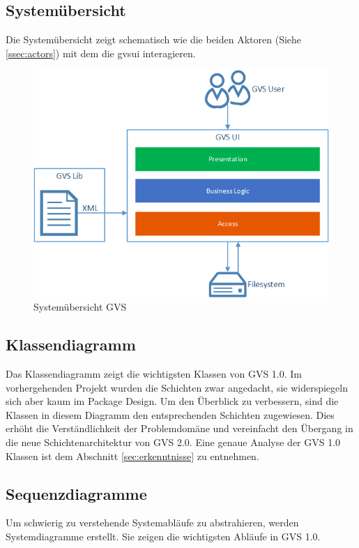 \documentclass[11pt,a4paper,english,oneside]{book}
\numberwithin{equation}{chapter}
\begin{document}
	\subsection{Systemübersicht}
	Die Systemübersicht zeigt schematisch wie die beiden Aktoren (Siehe \ref{ssec:actors}) mit dem  die \gls{gvsui} interagieren.
	
	\begin{figure}[h!]
		\centering
		\includegraphics[width=0.5\linewidth]{assets/images/system_overview}
		\caption{Systemübersicht GVS}
		\label{fig:gvs-systemuebersicht}
	\end{figure}
	
	\subsection{Klassendiagramm} \label{ssec:klassendiagramm-1}
	Das Klassendiagramm zeigt die wichtigsten Klassen von GVS 1.0. Im vorhergehenden Projekt wurden die Schichten zwar angedacht, sie widerspiegeln sich aber kaum im Package Design. Um den Überblick zu verbessern, sind die Klassen in diesem Diagramm den entsprechenden Schichten zugewiesen. Dies erhöht die Verständlichkeit der Problemdomäne und vereinfacht den Übergang in die neue Schichtenarchitektur von GVS 2.0. Eine genaue Analyse der GVS 1.0 Klassen ist dem Abschnitt \ref{sec:erkenntnisse} zu entnehmen. 
	
	
		
	\subsection{Sequenzdiagramme} \label{ssec:sequence-1}
	Um schwierig zu verstehende Systemabläufe zu abstrahieren, werden Systemdiagramme erstellt. Sie zeigen die wichtigsten Abläufe in GVS 1.0.
	
\end{document}
